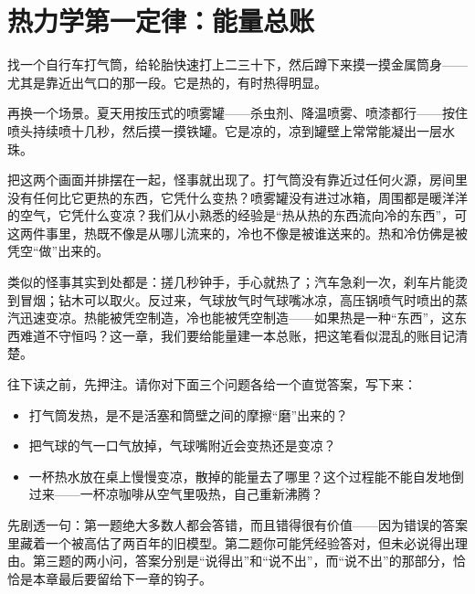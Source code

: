 \chapter{热力学第一定律：能量总账}


\begin{mainline}
找一个自行车打气筒，给轮胎快速打上二三十下，然后蹲下来摸一摸金属筒身——尤其是靠近出气口的那一段。它是热的，有时热得明显。

再换一个场景。夏天用按压式的喷雾罐——杀虫剂、降温喷雾、喷漆都行——按住喷头持续喷十几秒，然后摸一摸铁罐。它是凉的，凉到罐壁上常常能凝出一层水珠。

把这两个画面并排摆在一起，怪事就出现了。打气筒没有靠近过任何火源，房间里没有任何比它更热的东西，它凭什么变热？喷雾罐没有进过冰箱，周围都是暖洋洋的空气，它凭什么变凉？我们从小熟悉的经验是“热从热的东西流向冷的东西”，可这两件事里，热既不像是从哪儿流来的，冷也不像是被谁送来的。热和冷仿佛是被凭空“做”出来的。

类似的怪事其实到处都是：搓几秒钟手，手心就热了；汽车急刹一次，刹车片能烫到冒烟；钻木可以取火。反过来，气球放气时气球嘴冰凉，高压锅喷气时喷出的蒸汽迅速变凉。热能被凭空制造，冷也能被凭空制造——如果热是一种“东西”，这东西难道不守恒吗？这一章，我们要给能量建一本总账，把这笔看似混乱的账目记清楚。
\end{mainline}


\begin{mainline}
往下读之前，先押注。请你对下面三个问题各给一个直觉答案，写下来：

\begin{itemize}
  \item 打气筒发热，是不是活塞和筒壁之间的摩擦“磨”出来的？
  \item 把气球的气一口气放掉，气球嘴附近会变热还是变凉？
  \item 一杯热水放在桌上慢慢变凉，散掉的能量去了哪里？这个过程能不能自发地倒过来——一杯凉咖啡从空气里吸热，自己重新沸腾？
\end{itemize}

先剧透一句：第一题绝大多数人都会答错，而且错得很有价值——因为错误的答案里藏着一个被高估了两百年的旧模型。第二题你可能凭经验答对，但未必说得出理由。第三题的两小问，答案分别是“说得出”和“说不出”，而“说不出”的那部分，恰恰是本章最后要留给下一章的钩子。
\end{mainline}


